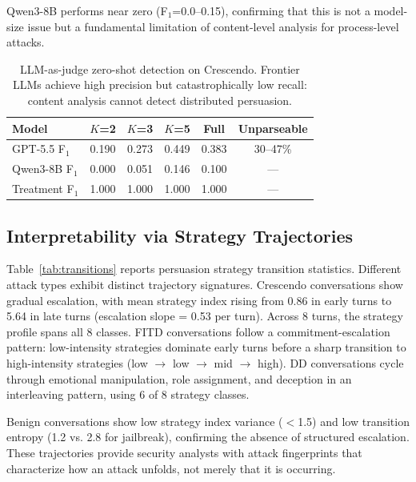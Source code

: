 \documentclass[11pt,a4paper]{article}
\newcommand{\fone}{F$_1$}
\begin{document}
Qwen3-8B performs near zero (\fone{}=0.0--0.15), confirming that this is not a model-size issue but a fundamental limitation of content-level analysis for process-level attacks.

\begin{table}[t]
\centering
\caption{LLM-as-judge zero-shot detection on Crescendo. Frontier LLMs achieve high precision but catastrophically low recall: content analysis cannot detect distributed persuasion.}
\label{tab:llm_judge}
\begin{tabular}{lccccc}
\toprule
Model & $K$=2 & $K$=3 & $K$=5 & Full & Unparseable \\
\midrule
GPT-5.5 \fone{}   & 0.190 & 0.273 & 0.449 & 0.383 & 30--47\% \\
Qwen3-8B \fone{}  & 0.000 & 0.051 & 0.146 & 0.100 & --- \\
Treatment \fone{}  & 1.000 & 1.000 & 1.000 & 1.000 & --- \\
\bottomrule
\end{tabular}
\end{table}

\subsection{Interpretability via Strategy Trajectories}
\label{sec:interpretability}

Table~\ref{tab:transitions} reports persuasion strategy transition statistics.
Different attack types exhibit distinct trajectory signatures.
Crescendo conversations show gradual escalation, with mean strategy index rising from 0.86 in early turns to 5.64 in late turns (escalation slope = 0.53 per turn).
Across 8 turns, the strategy profile spans all 8 classes.
FITD conversations follow a commitment-escalation pattern: low-intensity strategies dominate early turns before a sharp transition to high-intensity strategies (low $\to$ low $\to$ mid $\to$ high).
DD conversations cycle through emotional manipulation, role assignment, and deception in an interleaving pattern, using 6 of 8 strategy classes.

Benign conversations show low strategy index variance ($<$1.5) and low transition entropy (1.2 vs. 2.8 for jailbreak), confirming the absence of structured escalation.
These trajectories provide security analysts with attack fingerprints that characterize how an attack unfolds, not merely that it is occurring.
\end{document}
